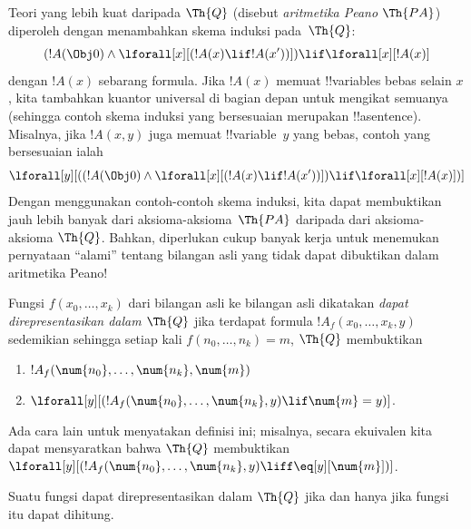 \documentclass[../../../include/open-logic-section]{subfiles}
\begin{document}
Teori yang lebih kuat daripada $\Th{Q}$ (disebut \emph{aritmetika Peano}
$\Th{PA}$) diperoleh dengan menambahkan skema induksi pada~$\Th{Q}$:
\[
(!A(\Obj 0) \land \lforall[x][(!A(x) \lif !A(x'))]) \lif \lforall[x][!A(x)]
\]
dengan $!A(x)$ sebarang formula. Jika $!A(x)$ memuat !!{variable}s bebas
selain $x$, kita tambahkan kuantor universal di bagian depan untuk mengikat
semuanya (sehingga contoh skema induksi yang bersesuaian merupakan
!!a{sentence}). Misalnya, jika $!A(x, y)$ juga memuat !!{variable}~$y$ yang
bebas, contoh yang bersesuaian ialah
\[
\lforall[y][((!A(\Obj 0) \land \lforall[x][(!A(x) \lif !A(x'))]) \lif
  \lforall[x][!A(x)])]
\]
Dengan menggunakan contoh-contoh skema induksi, kita dapat membuktikan jauh
lebih banyak dari aksioma-aksioma~$\Th{PA}$ daripada dari aksioma-aksioma
$\Th{Q}$. Bahkan, diperlukan cukup banyak kerja untuk menemukan pernyataan
``alami'' tentang bilangan asli yang tidak dapat dibuktikan dalam aritmetika
Peano!{}

\begin{defn}
  Fungsi $f(x_0,\ldots,x_k)$ dari bilangan asli ke bilangan asli dikatakan
  {\em dapat direpresentasikan dalam $\Th{Q}$} jika terdapat formula
  $!A_f(x_0,\dots,x_k,y)$ sedemikian sehingga setiap kali
  $f(n_0,\dots,n_k) = m$, $\Th{Q}$ membuktikan
\begin{enumerate}
\item{} $!A_f(\num{n_0}, \dots, \num{n_k}, \num{m})$
\item{} $\lforall[y][(!A_f(\num{n_0}, \dots,
\num{n_k}, y) \lif \num{m} = y)]$.
\end{enumerate}
\end{defn}

Ada cara lain untuk menyatakan definisi ini; misalnya, secara ekuivalen kita
dapat mensyaratkan bahwa $\Th{Q}$ membuktikan
$\lforall[y][(!A_f(\num{n_0}, \dots, \num{n_k}, y) \liff
\eq[y][\num{m}])]$.

\begin{thm}
Suatu fungsi dapat direpresentasikan dalam $\Th{Q}$ jika dan hanya jika
fungsi itu dapat dihitung.
\end{thm}
\end{document}
